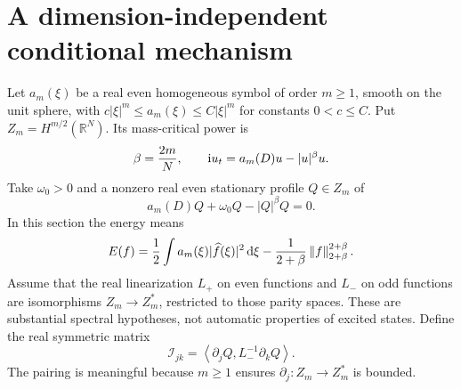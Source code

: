 \documentclass[11pt,a4paper]{article}
\theoremstyle{remark}\newtheorem{remark}[theorem]{Remark}
\newcommand{\R}{\mathbb R}\newcommand{\C}{\mathbb C}
\newcommand{\ii}{\mathrm i}\newcommand{\dd}{\,\mathrm d}
\newcommand{\norm}[1]{\left\|#1\right\|}
\newcommand{\ip}[2]{\left\langle #1,#2\right\rangle}
\begin{document}
\section{A dimension-independent conditional mechanism}\label{sec:criterion}
Let $a_m(\xi)$ be a real even homogeneous symbol of order $m\ge1$, smooth on the unit sphere, with $c|\xi|^m\le a_m(\xi)\le C|\xi|^m$ for constants $0<c\le C$. Put $Z_m=H^{m/2}(\R^N)$. Its mass-critical power is
\[
 \beta={2m\over N},\qquad \ii u_t=a_m(D)u-|u|^\beta u.
\]
Take $\omega_0>0$ and a nonzero real even stationary profile $Q\in Z_m$ of
\[
 a_m(D)Q+\omega_0Q-|Q|^\beta Q=0.
\]
In this section the energy means
\[
 E(f)={1\over2}\int a_m(\xi)|\widehat f(\xi)|^2\dd\xi
       -{1\over2+\beta}\norm f_{2+\beta}^{2+\beta}.
\]
Assume that the real linearization $L_+$ on even functions and $L_-$ on odd functions are isomorphisms $Z_m\to Z_m^*$, restricted to those parity spaces. These are substantial spectral hypotheses, not automatic properties of excited states. Define the real symmetric matrix
\[
 \mathcal I_{jk}=\ip{\partial_jQ}{L_-^{-1}\partial_kQ}.
\]
The pairing is meaningful because $m\ge1$ ensures $\partial_j:Z_m\to Z_m^*$ is bounded.
\end{document}
